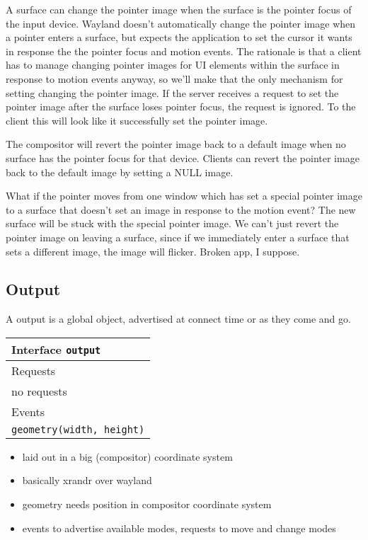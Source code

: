 \documentclass{article}
\begin{document}
A surface can change the pointer image when the surface is the pointer
focus of the input device.  Wayland doesn't automatically change the
pointer image when a pointer enters a surface, but expects the
application to set the cursor it wants in response the the pointer
focus and motion events.  The rationale is that a client has to manage
changing pointer images for UI elements within the surface in response
to motion events anyway, so we'll make that the only mechanism for
setting changing the pointer image.  If the server receives a request
to set the pointer image after the surface loses pointer focus, the
request is ignored.  To the client this will look like it successfully
set the pointer image.

The compositor will revert the pointer image back to a default image
when no surface has the pointer focus for that device.  Clients can
revert the pointer image back to the default image by setting a NULL
image.

What if the pointer moves from one window which has set a special
pointer image to a surface that doesn't set an image in response to
the motion event?  The new surface will be stuck with the special
pointer image.  We can't just revert the pointer image on leaving a
surface, since if we immediately enter a surface that sets a different
image, the image will flicker.  Broken app, I suppose.

\subsection{Output}

A output is a global object, advertised at connect time or as they
come and go.

\begin{tabular}{l}
  \hline 
  Interface \texttt{output} \\ \hline 
  Requests \\ \hline 
  no requests \\ \hline
  Events \\ \hline
  \texttt{geometry(width, height)} \\ \hline
\end{tabular}

\begin{itemize}
\item laid out in a big (compositor) coordinate system
\item basically xrandr over wayland
\item geometry needs position in compositor coordinate system\
\item events to advertise available modes, requests to move and change
  modes
\end{itemize}
\end{document}
